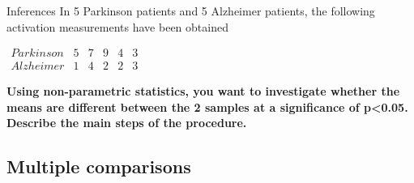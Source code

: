 \documentclass{beamer}
\begin{document}
\begin{frame}{Inferences}
  In 5 Parkinson patients and 5 Alzheimer patients, the following activation measurements have been obtained
  
  \smallskip
  
  $
  \begin{array}{cccccc}
    Parkinson &5 &7 &9 &4 &3\\
    Alzheimer &1 &4 &2 &2 &3
  \end{array}
  $
  
  \smallskip
  
  \textbf{Using non-parametric statistics, you want to investigate whether the means are different between the 2 samples at a significance of p<0.05. Describe the main steps of the procedure.}
  
\end{frame}




\subsection[Multiple comparisons]{Multiple comparisons}
\end{document}

